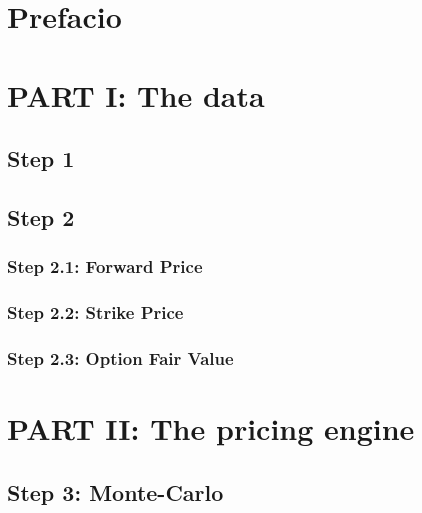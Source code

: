 \documentclass[12pt,a4paper]{article}
\renewcommand{\figurename}{Fig.}
\begin{document}


\renewcommand\contentsname{Contenidos}
\renewcommand{\figurename}{Figura}
\tableofcontents
\clearpage


\pagestyle{fancy}
\fancyhf{}
\cfoot{\thepage}
\headrule{}
\footrule{}
\renewcommand{\headrulewidth}{0.4pt}
\renewcommand{\footrulewidth}{0.4pt}


\section{Prefacio}

\section{PART I: The data}

\subsection{Step 1}

\subsection{Step 2}

\subsubsection{Step 2.1: Forward Price}

\subsubsection{Step 2.2: Strike Price}

\subsubsection{Step 2.3: Option Fair Value}

\section{PART II: The pricing engine}

\subsection{Step 3: Monte-Carlo}

\end{document}
